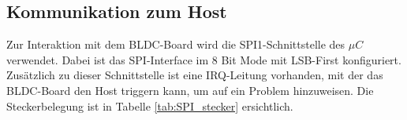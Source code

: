 

\subsection{Kommunikation zum Host}
Zur Interaktion mit dem BLDC-Board wird die SPI1-Schnittstelle des $\mu C$ verwendet. Dabei
ist das SPI-Interface im 8 Bit Mode mit LSB-First konfiguriert. Zusätzlich zu dieser Schnittstelle
ist eine IRQ-Leitung vorhanden, mit der das BLDC-Board den Host triggern kann, um auf ein Problem 
hinzuweisen. Die Steckerbelegung ist in Tabelle \ref{tab:SPI_stecker} ersichtlich.

